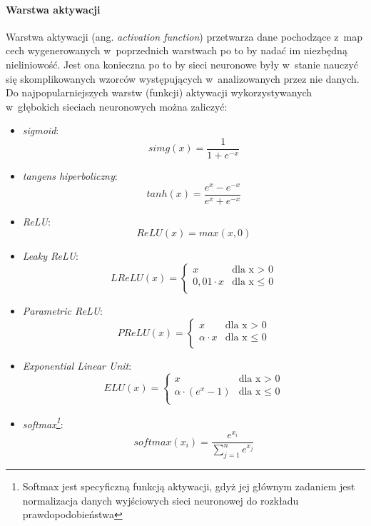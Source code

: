 \paragraph*{Warstwa aktywacji}

Warstwa aktywacji (ang. \emph{activation function}) przetwarza dane pochodzące z~map cech wygenerowanych w~poprzednich warstwach po to by nadać im niezbędną nieliniowość. Jest ona konieczna po to by sieci neuronowe były w~stanie nauczyć się skomplikowanych wzorców występujących w~analizowanych przez nie danych. Do najpopularniejszych warstw (funkcji) aktywacji wykorzystywanych w~głębokich sieciach neuronowych można zaliczyć:

\begin{itemize}
\item \emph{sigmoid}:
 \begin{equation}
simg(x) = \frac{1}{1 + e^{-x}}
\end{equation}
\item \emph{tangens hiperboliczny}: 
 \begin{equation}
tanh(x) = \frac{e^x-e^{-x}}{e^{x}+e^{-x}}
\end{equation}
\item \emph{ReLU}:
 \begin{equation}
 ReLU(x) = max(x, 0)
\end{equation}
\item \emph{Leaky ReLU}:
 \begin{equation}
  LReLU(x) = 
 \begin{cases}
  x & \text{dla x > 0}  \\
  0,01 \cdot x & \text{dla x $\leq$ 0} \\
  \end{cases}
\end{equation}
\item \emph{Parametric ReLU}:
 \begin{equation}
 PReLU(x) =  
 \begin{cases}
  x & \text{dla x > 0}  \\
  \alpha \cdot x & \text{dla x $\leq$ 0} \\
  \end{cases}
\end{equation}
\item \emph{Exponential Linear Unit}:
 \begin{equation}
 ELU(x) = 
  \begin{cases}
  x & \text{dla x >  0}  \\
  \alpha \cdot (e^{x}-1)  & \text{dla x $\leq$ 0} \\
  \end{cases}
\end{equation}
\item \emph{softmax\footnote{Softmax jest specyficzną funkcją aktywacji, gdyż jej głównym zadaniem jest normalizacja danych wyjściowych sieci neuronowej do rozkładu prawdopodobieństwa}}:
 \begin{equation}
 softmax(x_i) = \frac{e^{x_i}}{\sum_{j=1}^{n}e^{x_j}}
\end{equation}
\end{itemize}

